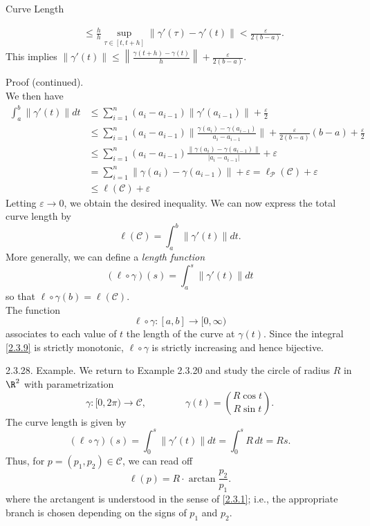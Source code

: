 \documentclass[smaller,hyperref={CJKbookmarks=true}]{beamer}
\begin{document}
\begin{frame}{Curve Length}
\begin{spacing}{1.05}
\begin{itemize}
\begin{equation*}
\begin{split}
         &\leq\frac{h}{h}\sup\limits_{\tau\in[t,t+h]}\|\gamma'(\tau)-\gamma'(t)\|<\frac{\varepsilon}{2(b-a)}.
    \end{split}
  \end{equation*}
This implies $\displaystyle \|\gamma'(t)\|\leq\left\|\frac{\gamma(t+h)-\gamma(t)}{h}\right\|+\frac{\varepsilon}{2(b-a)}.$
\end{itemize}
\newpage
\alert{Proof (continued).}\\
We then have
\begin{equation*}
  \begin{split}
     \int_{a}^{b}\|\gamma'(t)\|dt &\leq\sum_{i=1}^{n}(a_i-a_{i-1})\|\gamma'(a_{i-1})\|
     +\frac{\varepsilon}{2} \\
       &\leq\sum_{i=1}^{n}(a_i-a_{i-1})\Big\|\frac{\gamma(a_i)-\gamma(a_{i-1})}{a_i-a_{i-1}}\Big\|
       +\frac{\varepsilon}{2(b-a)}(b-a)+\frac{\varepsilon}{2}  \\
       &\leq\sum_{i=1}^{n}(a_i-a_{i-1})\frac{\|\gamma(a_i)-\gamma(a_{i-1})\|}{|a_i-a_{i-1}|}+\varepsilon  \\
       &=\sum_{i=1}^{n}\|\gamma(a_i)-\gamma(a_{i-1})\|+\varepsilon
       =\ell_\mathcal{P}(\mathcal{C})+\varepsilon  \\
       &\leq\ell(\mathcal{C})+\varepsilon
  \end{split}
\end{equation*}
\vspace*{-5pt}
Letting $\varepsilon\to0$, we obtain the desired inequality.\quad{$\square$}
\newpage
We can now express the total curve length by
\[\ell(\mathcal{C})=\int_{a}^{b}\|\gamma'(t)\|dt.\]
More generally, we can define a \emph{length function}
\begin{equation}\label{2.3.9}
  (\ell\circ\gamma)(s)=\int_{a}^{s}\|\gamma'(t)\|dt
\end{equation}
so that $\ell\circ\gamma(b)=\ell(\mathcal{C})$.\\[6pt]
The function
\[\ell\circ\gamma:[a,b]\to[0,\infty)\]
associates to each value of $t$ the length of the curve at $\gamma(t)$. Since the integral \eqref{2.3.9} is strictly monotonic, $\ell\circ\gamma$ is strictly increasing and hence bijective.
\end{spacing}
\newpage
\begin{spacing}{0.95}
\alert{2.3.28. Example.} We return to Example 2.3.20 and study the circle of radius $R$ in $\R^2$ with parametrization
\[\gamma:[0,2\pi)\to\mathcal{C},\qquad\qquad
\gamma(t)=\binom{R\cos t}{R\sin t}.\]
The curve length is given by
\[(\ell\circ\gamma)(s)=\int_{0}^{s}\|\gamma'(t)\|dt
=\int_{0}^{s}R\,dt=Rs.\]
Thus, for $p=(p_1,p_2)\in\mathcal{C}$, we can read of{}f
\[\ell(p)=R\cdot\arctan\frac{p_2}{p_1}.\]
where the arctangent is understood in the sense of \eqref{2.3.1}; i.e., the
appropriate branch is chosen depending on the signs of $p_1$ and $p_2$.
\end{spacing}
\end{frame}
\end{document}
